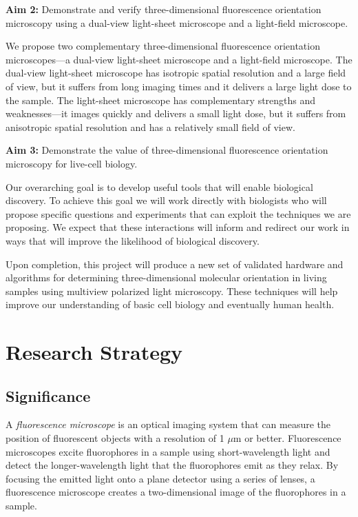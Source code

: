 \documentclass[11pt]{article}
\begin{document}
\noindent\textbf{Aim 2:} Demonstrate and verify three-dimensional fluorescence
orientation microscopy using a dual-view light-sheet microscope and a
light-field microscope.

We propose two complementary three-dimensional fluorescence orientation
microscopes---a dual-view light-sheet microscope and a light-field
microscope. The dual-view light-sheet microscope has isotropic spatial
resolution and a large field of view, but it suffers from long imaging times and
it delivers a large light dose to the sample. The light-sheet microscope has
complementary strengths and weaknesses---it images quickly and delivers a small
light dose, but it suffers from anisotropic spatial resolution and has a
relatively small field of view.

\noindent\textbf{Aim 3:} Demonstrate the value of three-dimensional fluorescence
orientation microscopy for live-cell biology.

Our overarching goal is to develop useful tools that will enable biological
discovery. To achieve this goal we will work directly with biologists who will
propose specific questions and experiments that can exploit the techniques we
are proposing. We expect that these interactions will inform and redirect our
work in ways that will improve the likelihood of biological discovery.

Upon completion, this project will produce a new set of validated hardware and
algorithms for determining three-dimensional molecular orientation in living
samples using multiview polarized light microscopy. These techniques will help
improve our understanding of basic cell biology and eventually human health.

\pagebreak

\section*{Research Strategy}
\subsection*{Significance}
A \textit{fluorescence microscope} is an optical imaging system that can measure
the position of fluorescent objects with a resolution of 1 $\mu$m or better.
Fluorescence microscopes excite fluorophores in a sample using short-wavelength
light and detect the longer-wavelength light that the fluorophores emit as they
relax. By focusing the emitted light onto a plane detector using a series of
lenses, a fluorescence microscope creates a two-dimensional image of the
fluorophores in a sample.
\end{document}
